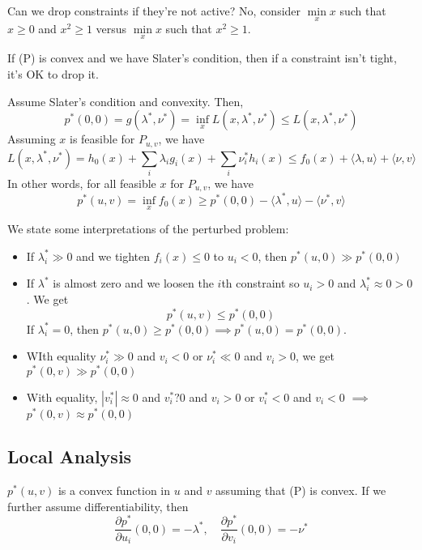 \documentclass[english, 11pt]{article}
\begin{document}
  \begin{rem}
  Can we drop constraints if they're not active? No, consider $\min \limits_{x} x$ such that $x \ge 0$ and $x^2 \ge 1$ versus $\min \limits_{x} x$ such that $x^2 \ge 1$.
  \end{rem}
  
  \begin{thrm}
  If (P) is convex and we have Slater's condition, then if a constraint isn't tight, it's OK to drop it.
  \end{thrm}
  
  \begin{rem}
  Assume Slater's condition and convexity. Then,
  \[
  p^*(0,0) = g(\lambda^*,\nu^*) = \inf \limits_x L(x,\lambda^*,\nu^*) \le L(x,\lambda^*,\nu^*)
  \]
  Assuming $x$ is feasible for $P_{u,v}$, we have
  \[
  L(x,\lambda^*,\nu^*) = h_0(x) + \sum_i \lambda_i g_i(x) + \sum_i \nu_i^* h_i(x) 
  \le f_0(x) + \langle \lambda , u \rangle + \langle \nu,v \rangle
  \]
  In other words, for all feasible $x$ for $P_{u,v}$, we have
  \[
 p^*(u,v) = \inf \limits_x f_0(x) \ge p^*(0,0) - \langle \lambda^*, u \rangle - \langle \nu^*, v \rangle
  \]
   \end{rem}

\begin{rem}
We state some interpretations of the perturbed problem:
\begin{itemize}
\item If $\lambda_i^* \gg 0$ and we tighten $f_i(x) \le 0$ to $u_i <0$, then $p^*(u,0) \gg p^*(0,0)$
\item If $\lambda^*$ is almost zero and we loosen the $i$th constraint so $u_i >0$ and $\lambda_i^* \approx 0 >0$. We get
\[
p^*(u,v) \le p^*(0,0)
\]
If $\lambda_i^* =0$, then $p^*(u,0) \ge p^*(0,0) \implies p^*(u,0) = p^*(0,0)$.

\item WIth equality $\nu_i^* \gg 0$ and $v_i<0$ or $\nu_i^*\ll 0$ and $v_i >0$, we get $p^*(0,v) \gg p^*(0,0)$

\item With equality, $|v_i^* | \approx 0$ and $v_i^* ?0$ and $v_i >0$ or $v_i^* <0 $ and $v_i<0$ $\implies$ $p^*(0,v) \approx p^*(0,0)$
\end{itemize}
\end{rem}

\subsection{Local Analysis}
$p^*(u,v)$ is a convex function in $u$ and $v$ assuming that (P) is convex. If we further assume differentiability, then
\[
\frac{\partial p^*}{\partial u_i} (0,0) = - \lambda^*, \quad \frac{\partial p^*}{\partial v_i} (0,0) = - \nu^*
\]
\end{document}
